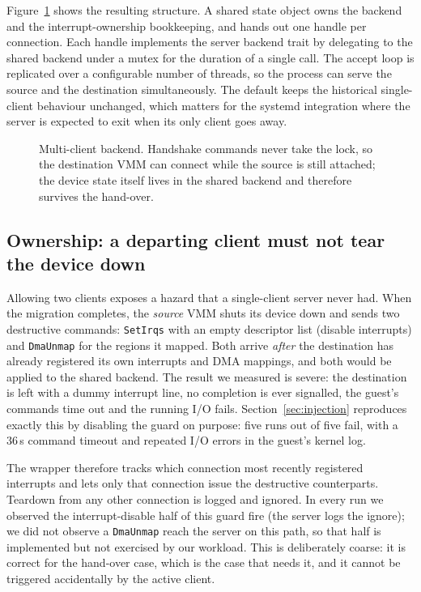 \documentclass[10pt,conference]{IEEEtran}
\newcommand{\code}[1]{\texttt{#1}}
\begin{document}
Figure~\ref{fig:multiclient} shows the resulting structure. A shared state object
owns the backend and the interrupt-ownership bookkeeping, and hands out one
handle per connection. Each handle implements the server backend trait by
delegating to the shared backend under a mutex for the duration of a single
call. The accept loop is replicated over a configurable number of threads, so
the process can serve the source and the destination simultaneously. The
default keeps the historical single-client behaviour unchanged, which matters
for the systemd integration where the server is expected to exit when its only
client goes away.

\begin{figure}[t]
\centering

\caption{Multi-client backend. Handshake commands never take the lock, so the
destination VMM can connect while the source is still attached; the device
state itself lives in the shared backend and therefore survives the hand-over.}
\label{fig:multiclient}
\end{figure}

\subsection{Ownership: a departing client must not tear the device down}
\label{sec:ownership}
Allowing two clients exposes a hazard that a single-client server never had.
When the migration completes, the \emph{source} VMM shuts its device down and
sends two destructive commands: \code{SetIrqs} with an empty descriptor list
(disable interrupts) and \code{DmaUnmap} for the regions it mapped. Both arrive
\emph{after} the destination has already registered its own interrupts and DMA
mappings, and both would be applied to the shared backend. The result we
measured is severe: the destination is left with a dummy interrupt line, no
completion is ever signalled, the guest's commands time out and the running I/O
fails. Section~\ref{sec:injection} reproduces exactly this by disabling the
guard on purpose: five runs out of five fail, with a 36\,s command timeout and
repeated I/O errors in the guest's kernel log.

The wrapper therefore tracks which connection most recently registered
interrupts and lets only that connection issue the destructive counterparts.
Teardown from any other connection is logged and ignored. In every run we
observed the interrupt-disable half of this guard fire (the server logs the
ignore); we did not observe a \code{DmaUnmap} reach the server on this path, so
that half is implemented but not exercised by our workload. This is deliberately
coarse: it is correct for the hand-over case, which is the case that needs it,
and it cannot be triggered accidentally by the active client.
\end{document}
